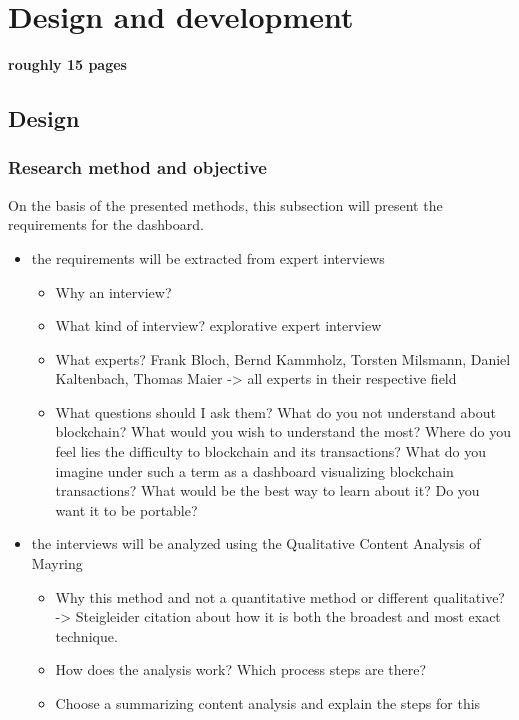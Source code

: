 \chapter{Design and development}
\textbf{roughly 15 pages}
\section{Design}
\subsection{Research method and objective}
On the basis of the presented methods, this subsection will present the requirements for the dashboard.

\begin{itemize}
    \item the requirements will be extracted from expert interviews
    \begin{itemize}
        \item Why an interview?
        \item What kind of interview? explorative expert interview
        \item What experts? Frank Bloch, Bernd Kammholz, Torsten Milsmann, Daniel Kaltenbach, Thomas Maier -> all experts in their respective field
        \item What questions should I ask them? What do you not understand about blockchain? What would you wish to understand the most? Where do you feel lies the difficulty to blockchain and its transactions? What do you imagine under such a term as a dashboard visualizing blockchain transactions? What would be the best way to learn about it? Do you want it to be portable?
    \end{itemize}
    \item the interviews will be analyzed using the Qualitative Content Analysis of Mayring
    \begin{itemize}
        \item Why this method and not a quantitative method or different qualitative? -> Steigleider citation about how it is both the broadest and most exact technique. 
        \item How does the analysis work? Which process steps are there?
        \item Choose a summarizing content analysis and explain the steps for this
    \end{itemize}
\end{itemize}

